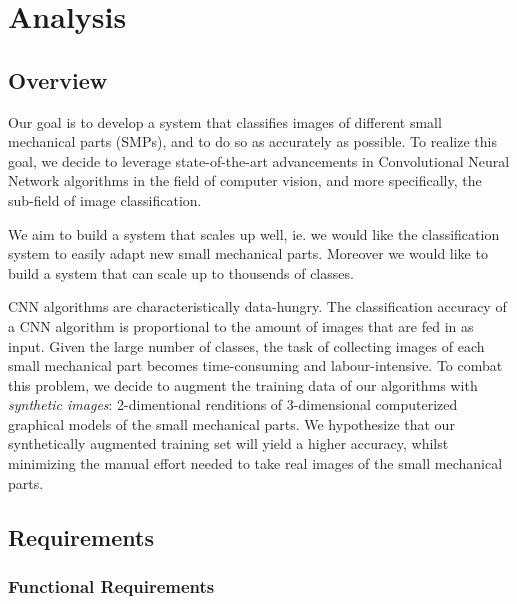 \documentclass[a4paper,12pt,twoside]{report}
\begin{document}

\chapter{Analysis}


\section{Overview}

Our goal is to develop a system that classifies images of different small mechanical parts (SMPs), and to do so as accurately as possible. To realize this goal, we decide to leverage state-of-the-art advancements in Convolutional Neural Network algorithms in the field of computer vision, and more specifically, the sub-field of image classification.

We aim to build a system that scales up well, ie. we would like the classification system to easily adapt new small mechanical parts. Moreover we would like to build a system that can scale up to thousends of classes.

CNN algorithms are characteristically data-hungry. The classification accuracy of a CNN algorithm is proportional to the amount of images that are fed in as input. Given the large number of classes, the task of collecting images of each small mechanical part becomes time-consuming and labour-intensive. To combat this problem, we decide to augment the training data of our algorithms with \textit{synthetic images}: 2-dimentional renditions of 3-dimensional computerized graphical models of the small mechanical parts. We hypothesize that our synthetically augmented training set will yield a higher accuracy, whilst minimizing the manual effort needed to take real images of the small mechanical parts.

\section{Requirements}

\subsection{Functional Requirements}
\end{document}
